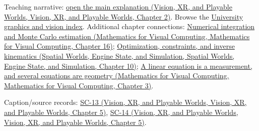 Teaching narrative: \href{../07-Vision-XR-and-Playable-Worlds/main.pdf\#nameddest=04-visual-computing-ii-ch031-generative-models-learn-distributions-and-samplers}{open the main explanation (Vision, XR, and Playable Worlds, Vision, XR, and Playable Worlds, Chapter 2)}. Browse the \hyperref[appendix-a6d556a4ef50-university-graphics-vision-and-photography---independent-series]{University graphics and vision index}. Additional chapter connections: \href{../02-Mathematics-for-Visual-Computing/main.pdf\#nameddest=03-visual-computing-i-ch012-numerical-integration-and-monte-carlo-estimation}{Numerical integration and Monte Carlo estimation (Mathematics for Visual Computing, Mathematics for Visual Computing, Chapter 16)}; \href{../05-Spatial-Worlds-Engine-State-and-Simulation/main.pdf\#nameddest=04-visual-computing-ii-ch029-optimization-constraints-and-inverse-kinematics}{Optimization, constraints, and inverse kinematics (Spatial Worlds, Engine State, and Simulation, Spatial Worlds, Engine State, and Simulation, Chapter 10)}; \href{../02-Mathematics-for-Visual-Computing/main.pdf\#nameddest=01-foundations-i-ch019-a-linear-equation-is-a-measurement-and-several-equations-are-geometry}{A linear equation is a measurement, and several equations are geometry (Mathematics for Visual Computing, Mathematics for Visual Computing, Chapter 3)}.

Caption/source records: \href{../07-Vision-XR-and-Playable-Worlds/main.pdf\#nameddest=04-visual-computing-ii-ch036-sc-13---stanford-cs231n-deep-learning-for-computer-vision-spring-2025-lecture-13-generative-models-1}{SC-13 (Vision, XR, and Playable Worlds, Vision, XR, and Playable Worlds, Chapter 5)}, \href{../07-Vision-XR-and-Playable-Worlds/main.pdf\#nameddest=04-visual-computing-ii-ch036-sc-14---stanford-cs231n-deep-learning-for-computer-vision-spring-2025-lecture-14-generative-models-2}{SC-14 (Vision, XR, and Playable Worlds, Vision, XR, and Playable Worlds, Chapter 5)}.
